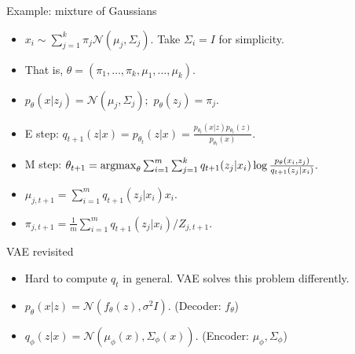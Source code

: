 \documentclass[final]{beamer}
\begin{document}
\begin{frame}{Example: mixture of Gaussians}
	\begin{itemize}
		\item $x_i \sim \sum_{j=1}^k \pi_j \mathcal{N}(\mu_j, \Sigma_j).$ Take $\Sigma_i = I$ for simplicity.
		\pause
		\item That is, $\theta = (\pi_1, \ldots, \pi_k, \mu_1, \ldots, \mu_k).$
		\pause
		\item $p_\theta(x|z_j) = \mathcal{N}(\mu_j, \Sigma_j);$ $p_\theta(z_j) = \pi_j.$
		\pause
	\item E step: $q_{t+1}(z|x) = p_{\theta_t}(z|x) = \frac{p_{\theta_t}(x|z)p_{\theta_t}(z)}{p_{\theta_t}(x)}.$
		\pause
	\item M step: $\theta_{t+1} = {\rm argmax}_\theta \sum_{i=1}^m \sum_{j=1}^k q_{t+1}(z_j|x_i) \log \frac{p_\theta(x_i, z_j)}{q_{t+1}(z_j|x_i)}.$

	\pause
	\item $\mu_{j,t+1} = \sum_{i=1}^m q_{t+1}(z_j|x_i) x_i.$
	\pause
\item $\pi_{j, t+1} = \frac{1}{m} \sum_{i=1}^m q_{t+1}(z_j|x_i)/Z_{j, t+1}.$
			
	\end{itemize}
\end{frame}
\begin{frame}{VAE revisited}
	\begin{itemize}
		\item Hard to compute $q_t$ in general. VAE solves this problem differently.
		\item $p_\theta(x|z) = \mathcal{N}(f_\theta(z), \sigma^2 I).$ (Decoder: $f_\theta$)
		\item $q_\phi(z|x) = \mathcal{N}(\mu_\phi(x), \Sigma_\phi(x)).$ (Encoder: $\mu_\phi, \Sigma_\phi$)
	\end{itemize}
\end{frame}
\end{document}
